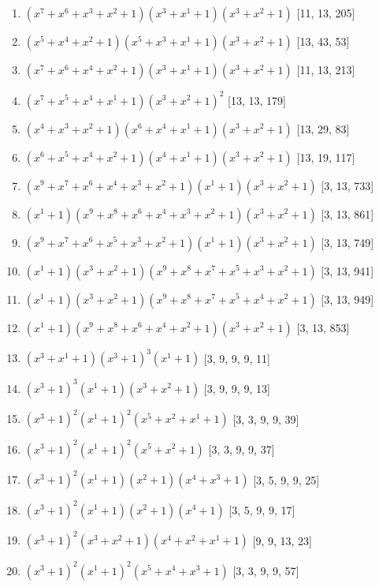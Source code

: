 \documentclass[10pt,twocolumn]{article}
\begin{document}
\begin{enumerate}
\item $(x^{7} + x^{6} + x^{3} + x^{2} + 1)(x^{3} + x^{1} + 1)(x^{3} + x^{2} + 1)$  [11, 13, 205]
\item $(x^{5} + x^{4} + x^{2} + 1)(x^{5} + x^{3} + x^{1} + 1)(x^{3} + x^{2} + 1)$  [13, 43, 53]
\item $(x^{7} + x^{6} + x^{4} + x^{2} + 1)(x^{3} + x^{1} + 1)(x^{3} + x^{2} + 1)$  [11, 13, 213]
\item $(x^{7} + x^{5} + x^{4} + x^{1} + 1)(x^{3} + x^{2} + 1)^{2}$  [13, 13, 179]
\item $(x^{4} + x^{3} + x^{2} + 1)(x^{6} + x^{4} + x^{1} + 1)(x^{3} + x^{2} + 1)$  [13, 29, 83]
\item $(x^{6} + x^{5} + x^{4} + x^{2} + 1)(x^{4} + x^{1} + 1)(x^{3} + x^{2} + 1)$  [13, 19, 117]
\item $(x^{9} + x^{7} + x^{6} + x^{4} + x^{3} + x^{2} + 1)(x^{1} + 1)(x^{3} + x^{2} + 1)$  [3, 13, 733]
\item $(x^{1} + 1)(x^{9} + x^{8} + x^{6} + x^{4} + x^{3} + x^{2} + 1)(x^{3} + x^{2} + 1)$  [3, 13, 861]
\item $(x^{9} + x^{7} + x^{6} + x^{5} + x^{3} + x^{2} + 1)(x^{1} + 1)(x^{3} + x^{2} + 1)$  [3, 13, 749]
\item $(x^{1} + 1)(x^{3} + x^{2} + 1)(x^{9} + x^{8} + x^{7} + x^{5} + x^{3} + x^{2} + 1)$  [3, 13, 941]
\item $(x^{1} + 1)(x^{3} + x^{2} + 1)(x^{9} + x^{8} + x^{7} + x^{5} + x^{4} + x^{2} + 1)$  [3, 13, 949]
\item $(x^{1} + 1)(x^{9} + x^{8} + x^{6} + x^{4} + x^{2} + 1)(x^{3} + x^{2} + 1)$  [3, 13, 853]
\item $(x^{3} + x^{1} + 1)(x^{3} + 1)^{3}(x^{1} + 1)$  [3, 9, 9, 9, 11]
\item $(x^{3} + 1)^{3}(x^{1} + 1)(x^{3} + x^{2} + 1)$  [3, 9, 9, 9, 13]
\item $(x^{3} + 1)^{2}(x^{1} + 1)^{2}(x^{5} + x^{2} + x^{1} + 1)$  [3, 3, 9, 9, 39]
\item $(x^{3} + 1)^{2}(x^{1} + 1)^{2}(x^{5} + x^{2} + 1)$  [3, 3, 9, 9, 37]
\item $(x^{3} + 1)^{2}(x^{1} + 1)(x^{2} + 1)(x^{4} + x^{3} + 1)$  [3, 5, 9, 9, 25]
\item $(x^{3} + 1)^{2}(x^{1} + 1)(x^{2} + 1)(x^{4} + 1)$  [3, 5, 9, 9, 17]
\item $(x^{3} + 1)^{2}(x^{3} + x^{2} + 1)(x^{4} + x^{2} + x^{1} + 1)$  [9, 9, 13, 23]
\item $(x^{3} + 1)^{2}(x^{1} + 1)^{2}(x^{5} + x^{4} + x^{3} + 1)$  [3, 3, 9, 9, 57]

\end{enumerate}
\end{document}
